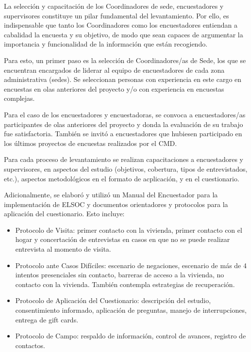 \documentclass[
  12pt,
]{article}
\begin{document}
La selección y capacitación de los Coordinadores de sede, encuestadores y supervisores constituye un pilar fundamental del levantamiento. Por ello, es indispensable que tanto los Coordinadores como los encuestadores entiendan a cabalidad la encuesta y su objetivo, de modo que sean capaces de argumentar la importancia y funcionalidad de la información que están recogiendo.

Para esto, un primer paso es la selección de Coordinadores/as de Sede, los que se encuentran encargados de liderar al equipo de encuestadores de cada zona administrativa (sedes). Se seleccionan personas con experiencia en este cargo en encuestas en olas anteriores del proyecto y/o con experiencia en encuestas complejas.

Para el caso de los encuestadores y encuestadoras, se convoca a encuestadores/as participantes de olas anteriores del proyecto y donda la evaluación de su trabajo fue satisfactoria. También se invitó a encuestadores que hubiesen participado en los últimos proyectos de encuestas realizados por el CMD.

Para cada proceso de levantamiento se realizan capacitaciones a encuestadores y supervisores, en aspectos del estudio (objetivos, cobertura, tipos de entrevistados, etc.), aspectos metodológicos en el formato de acplicación, y en el cuestionario.

Adicionalmente, se elaboró y utilizó un Manual del Encuestador para la implementación de ELSOC y documentos orientadores y protocolos para la aplicación del cuestionario. Esto incluye:

\begin{itemize}
\item
  Protocolo de Visita: primer contacto con la vivienda, primer contacto con el hogar y concertación de entrevistas en casos en que no se puede realizar entrevista al momento de visita.
\item
  Protocolo ante Casos Difíciles: escenario de negaciones, escenario de más de 4 intentos presenciales sin contacto, barreras de acceso a la vivienda, no contacto con la vivienda. También contempla estrategias de recuperación.
\item
  Protocolo de Aplicación del Cuestionario: descripción del estudio, consentimiento informado, aplicación de preguntas, manejo de interrupciones, entrega de gift cards.
\item
  Protocolo de Campo: respaldo de información, control de avances, registro de contactos.
\end{itemize}
\end{document}
